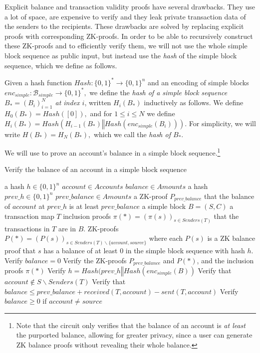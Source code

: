Explicit balance and transaction validity proofs have several drawbacks. They use a lot of space, are expensive to verify and they leak private transaction data of the senders to the recipients. These drawbacks are solved by replacing explicit proofs with corresponding ZK-proofs. In order to be able to recursively construct these ZK-proofs and to efficiently verify them, we will not use the whole simple block sequence as public input, but instead use the \emph{hash} of the simple block sequence, which we define as follows.

\begin{defn}
  Given a hash function \(Hash : \{0,1\}^* \rightarrow \{0,1\}^n\) and an encoding of simple blocks \(enc_{simple} : \mathcal{B}_{simple} \rightarrow \{0,1\}^*,\) we define the \emph{hash of a simple block sequence \(B_* = (B_i)_{i=1}^N\) at index \(i\)}, written \(H_i(B_*)\) inductively as follows. We define \(H_0(B_*) = Hash([0]),\) and for \(1 \leq i \leq N\) we define \(H_i(B_*) = Hash(H_{i-1}(B_*) \mathbin\Vert Hash(enc_{simple}(B_i))).\) For simplicity, we will write \(H(B_*) = H_N(B_*),\) which we call the \emph{hash of \(B_*\)}.
\end{defn}

We will use  to prove an account's balance in a simple block sequence.\footnote{Note that the circuit only verifies that the balance of an account is \emph{at least} the purported balance, allowing for greater privacy, since a user can generate ZK balance proofs without revealing their whole balance.}

\begin{circuit}[H]
\caption{Verify the balance of an account in a simple block sequence}
\label{alg:zkp-balance-computation}
\begin{algorithmic}[1]
\Public
  \Statex a hash \(h \in \{0,1\}^n\)
  \Statex \(account \in Accounts\)
  \Statex \(balance \in Amounts\)
\Private
  \Statex a hash \(prev\_h \in \{0,1\}^n\)
  \Statex \(prev\_balance \in Amounts\)
  \Statex a ZK-proof \(P_{prev\_balance}\) that the balance of \(account\) at \(prev\_h\) is at least \(prev\_balance\)
  \Statex a simple block \(B = (S,C)\)
  \Statex a transaction map \(T\)
  \Statex inclusion proofs \(\pi(*) = (\pi(s))_{s \in Senders(T)}\) that the transactions in \(T\) are in \(B\).
  \Statex ZK-proofs \(P(*) = (P(s))_{s \in Senders(T) \backslash \{account, source\}}\) where each \(P(s)\) is a ZK balance proof that \(s\) has a balance of at least 0 in the simple block sequence with hash \(h\).
  \State Verify \(balance = 0\)
\Else
  \State Verify the ZK-proofs \(P_{prev\_balance}\) and \(P(*)\), and the inclusion proofs \(\pi(*)\)
  \State Verify \(h = Hash(prev\_h \mathbin\Vert Hash(enc_{simple}(B))\)
  \State Verify that \(account \notin S \backslash Senders(T)\)
  \State Verify that \(
  balance \leq prev\_balance + received(T,account) - sent(T,account)\)
  \State Verify \(balance \geq 0\) if \(account \neq source\)
\EndIf
\end{algorithmic}
\end{circuit}

